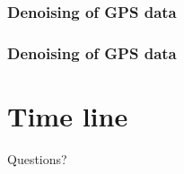 \documentclass{beamer}
\begin{document}
	\begin{frame}
		\frametitle{Denoising of GPS data}
	\end{frame}

	\begin{frame}
		\frametitle{Denoising of GPS data}
	\end{frame}


	\section{Time line}

	\begin{frame}
		\begin{Huge}
			\begin{center}
				Questions?
			\end{center}
		\end{Huge}
	\end{frame}
			
\end{document}
